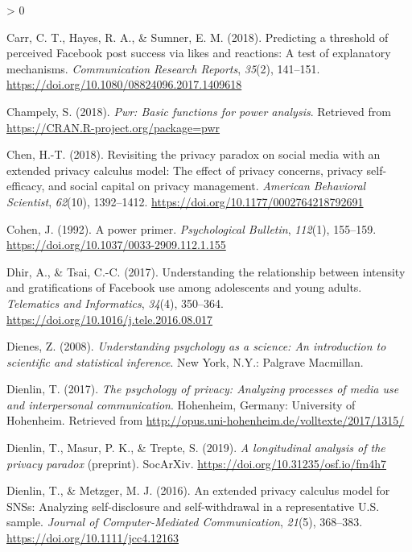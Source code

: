 \documentclass[
  english,
  man,floatsintext]{apa6}
\newlength{\cslhangindent}
\newenvironment{CSLReferences}[2] %
 {%
  \setlength{\parindent}{0pt}
  \ifodd #1 \everypar{\setlength{\hangindent}{\cslhangindent}}\ignorespaces\fi
  \ifnum #2 > 0
  \setlength{\parskip}{#2\baselineskip}
  \fi
 }%
 {}
\begin{document}
\begin{CSLReferences}{1}{0}
\leavevmode\hypertarget{ref-carrPredictingThresholdPerceived2018}{}%
Carr, C. T., Hayes, R. A., \& Sumner, E. M. (2018). Predicting a threshold of perceived {Facebook} post success via likes and reactions: {A} test of explanatory mechanisms. \emph{Communication Research Reports}, \emph{35}(2), 141--151. \url{https://doi.org/10.1080/08824096.2017.1409618}

\leavevmode\hypertarget{ref-R-pwr}{}%
Champely, S. (2018). \emph{Pwr: Basic functions for power analysis}. Retrieved from \url{https://CRAN.R-project.org/package=pwr}

\leavevmode\hypertarget{ref-chenRevisitingPrivacyParadox2018}{}%
Chen, H.-T. (2018). Revisiting the privacy paradox on social media with an extended privacy calculus model: {The} effect of privacy concerns, privacy self-efficacy, and social capital on privacy management. \emph{American Behavioral Scientist}, \emph{62}(10), 1392--1412. \url{https://doi.org/10.1177/0002764218792691}

\leavevmode\hypertarget{ref-cohenPowerPrimer1992}{}%
Cohen, J. (1992). A power primer. \emph{Psychological Bulletin}, \emph{112}(1), 155--159. \url{https://doi.org/10.1037/0033-2909.112.1.155}

\leavevmode\hypertarget{ref-dhirUnderstandingRelationshipIntensity2017}{}%
Dhir, A., \& Tsai, C.-C. (2017). Understanding the relationship between intensity and gratifications of {Facebook} use among adolescents and young adults. \emph{Telematics and Informatics}, \emph{34}(4), 350--364. \url{https://doi.org/10.1016/j.tele.2016.08.017}

\leavevmode\hypertarget{ref-dienesUnderstandingPsychologyScience2008}{}%
Dienes, Z. (2008). \emph{Understanding psychology as a science: {An} introduction to scientific and statistical inference}. New York, N.Y.: Palgrave Macmillan.

\leavevmode\hypertarget{ref-dienlinPsychologyPrivacyAnalyzing2017}{}%
Dienlin, T. (2017). \emph{The psychology of privacy: {Analyzing} processes of media use and interpersonal communication}. Hohenheim, Germany: University of Hohenheim. Retrieved from \url{http://opus.uni-hohenheim.de/volltexte/2017/1315/}

\leavevmode\hypertarget{ref-dienlinLongitudinalAnalysisPrivacy2019}{}%
Dienlin, T., Masur, P. K., \& Trepte, S. (2019). \emph{A longitudinal analysis of the privacy paradox} (preprint). SocArXiv. \url{https://doi.org/10.31235/osf.io/fm4h7}

\leavevmode\hypertarget{ref-dienlinExtendedPrivacyCalculus2016}{}%
Dienlin, T., \& Metzger, M. J. (2016). An extended privacy calculus model for {SNSs}: {Analyzing} self-disclosure and self-withdrawal in a representative {U}.{S}. sample. \emph{Journal of Computer-Mediated Communication}, \emph{21}(5), 368--383. \url{https://doi.org/10.1111/jcc4.12163}


\end{CSLReferences}
\end{document}
